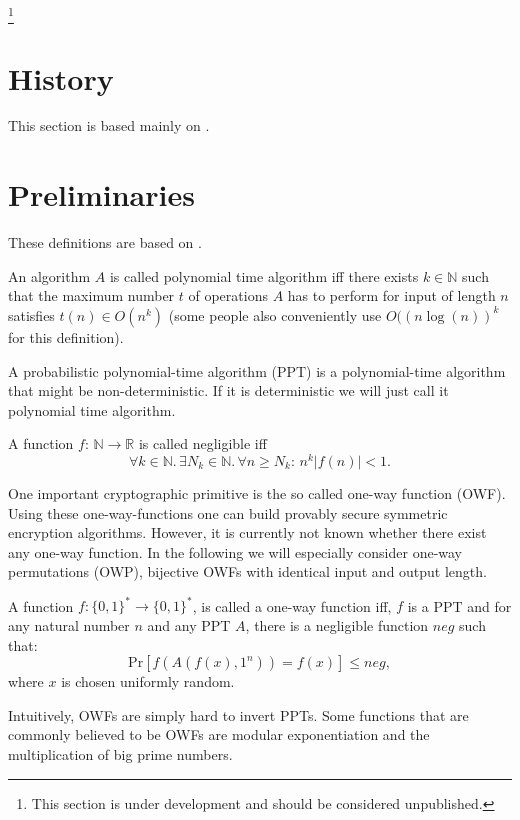    \footnote{This section is under development and should be considered unpublished.}

\section{History}

This section is based mainly on \cite{cryptoNetworkSlides}. 


\section{Preliminaries}
These definitions are based on \cite{PuMaC2016}. 

\begin{definition}
 An algorithm $A$ is called polynomial time algorithm iff there exists $k\in \mathbb{N}$ such that the maximum number $t$ of operations $A$ has to perform for input of length $n$ satisfies $t(n)\in O(n^k)$ (some people also conveniently use $O((n\log(n))^k$ for this definition).
\end{definition}

\begin{definition}
 A probabilistic polynomial-time algorithm (PPT) is a polynomial-time algorithm that might be non-deterministic. If it is deterministic we will just call it polynomial time algorithm.
\end{definition}

\begin{definition}
 A function $f:\,\mathbb{N}\to\mathbb{R}$ is called negligible iff $$\forall k\in\mathbb{N}.\,\exists N_k\in\mathbb{N}.\,\forall n\geq N_k:\,n^k\left|f(n)\right|<1.$$
\end{definition}

One important cryptographic primitive is the so called one-way function (OWF). Using these one-way-functions one can build provably secure symmetric encryption algorithms. However, it is currently not known whether there exist any one-way function. In the following we will especially consider one-way permutations (OWP), bijective OWFs with identical input and output length. 

\begin{definition}
 A function $f:\{0,1\}^*\to \{0,1\}^*$, is called a one-way function iff, $f$ is a PPT and for any natural number $n$ and any PPT $A$, there is a negligible function $neg$ such that: $$\mathrm{Pr}\left[f(A(f(x),1^n))=f(x)\right]\leq neg,$$ where $x$ is chosen uniformly random.
\end{definition}
Intuitively, OWFs are simply hard to invert PPTs. Some functions that are commonly believed to be OWFs are modular exponentiation and the multiplication of big prime numbers. 

